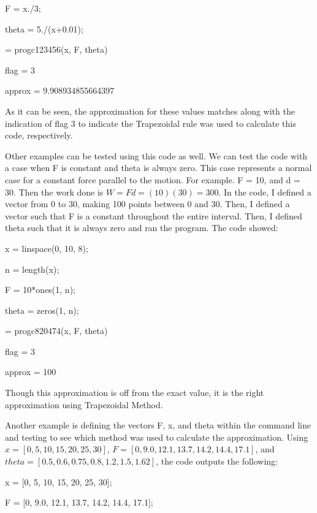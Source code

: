 \documentclass{article}
\begin{document}
{\par \medskip
F = x./3;
\par \medskip
theta = 5./(x+0.01);
\par {} = progc123456(x, F, theta)
\par \medskip
flag = 3
\par \medskip
approx = 9.908934855664397
\par \medskip
\par \medskip
As it can be seen, the approximation for these values matches along with the indication of flag 3 to indicate the Trapezoidal rule was used to calculate this code, respectively.
\par \medskip
Other examples can be tested using this code as well.   We can test the code with a case when F is constant and theta is always zero.  This case represents a normal case for a constant force parallel to the motion.  For example. F = 10, and d = 30. Then the work done is $W = Fd = (10)(30) = 300$.  In the code, I defined a vector from 0 to 30, making 100 points between 0 and 30.  Then, I defined a vector such that F is a constant throughout the entire interval.  Then, I defined theta such that it is always zero and ran the program.  The code showed:
\par \medskip
x = linspace(0, 10, 8);
\par \medskip
n = length(x);
\par \medskip
F = 10*ones(1, n);
\par \medskip
theta = zeros(1, n);
\par {} = progc820474(x, F, theta)
\par \medskip
flag = 3
\par \medskip
approx = 100
\par \medskip
\par \medskip
Though this approximation is off from the exact value, it is the right approximation using Trapezoidal Method.  
\par \medskip
Another example is defining the vectors F, x, and theta within the command line and testing to see which method was used to calculate the approximation.  Using $x = [0, 5, 10, 15, 20, 25, 30]$, $F=[0, 9.0, 12.1, 13.7, 14.2, 14.4, 17.1]$, and $theta = [0.5, 0.6, 0.75, 0.8, 1.2, 1.5, 1.62]$, the code outputs the following:
\par \medskip
x = [0, 5, 10, 15, 20, 25, 30];
\par \medskip
F = [0, 9.0, 12.1, 13.7, 14.2, 14.4, 17.1];
\par \medskip
}
\end{document}
